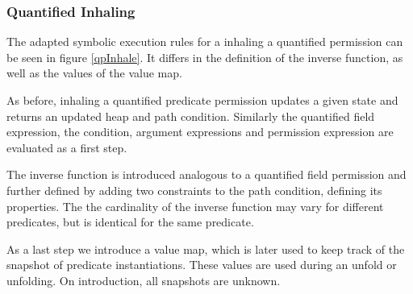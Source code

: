 \documentclass[12pt]{article}
\begin{document}
\subsubsection{Quantified Inhaling} 
\label{qpInhaleSec}
The adapted symbolic execution rules for a inhaling a quantified permission can be seen in figure \ref{qpInhale}. It differs in the definition of the inverse function, as well as the values of the value map.

As before, inhaling a quantified predicate permission updates a given state and returns an updated heap and path condition. Similarly the quantified field expression, the condition, argument expressions and permission expression are evaluated as a first step.

The inverse function is introduced analogous to a quantified field permission and further defined by adding two constraints to the path condition, defining its properties. The the cardinality of the inverse function may vary for different predicates, but is identical for the same predicate.

As a last step we introduce a value map, which is later used to keep track of the snapshot of predicate instantiations. These values are used during an unfold or unfolding. On introduction, all snapshots are unknown.
\end{document}
